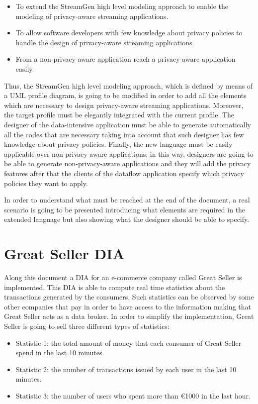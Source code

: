 \begin{itemize}
\item To extend the StreamGen high level modeling approach to enable the modeling of privacy-aware streaming applications.
\item To allow software developers with few knowledge about privacy policies to handle the design of privacy-aware streaming applications.
\item From a non-privacy-aware application reach a privacy-aware application easily.
\end{itemize}

Thus, the StreamGen high level modeling approach, which is defined by means of a UML profile diagram, is going to be modified in order to add all the elements which are necessary to design privacy-aware streaming applications. Moreover, the target profile must be elegantly integrated with the current profile. The designer of the data-intensive application must be able to generate automatically all the codes that are necessary taking into account that such designer has few knowledge about privacy policies. Finally, the new language must be easily applicable over non-privacy-aware applications; in this way, designers are going to be able to generate non-privacy-aware applications and they will add the privacy features after that the clients of the dataflow application specify which privacy policies they want to apply.

In order to understand what must be reached at the end of the document, a real scenario is going to be presented introducing what elements are required in the extended language but also showing what the designer should be able to specify.

\section{Great Seller DIA}
Along this document a DIA for an e-commerce company called Great Seller is implemented. This DIA is able to compute real time statistics about the transactions generated by the consumers. Such statistics can be observed by some other companies that pay in order to have access to the information making that Great Seller acts as a data broker. In order to simplify the implementation, Great Seller is going to sell three different types of statistics:

\begin{itemize}
\item Statistic 1: the total amount of money that each consumer of Great Seller spend in the last 10 minutes.
\item Statistic 2: the number of transactions issued by each user in the last 10 minutes.
\item Statistic 3: the number of users who spent more than \euro{1000} in the last hour.
\end{itemize}

